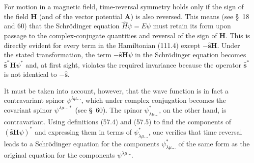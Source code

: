 For motion in a magnetic field, time-reversal symmetry holds only if the sign of the field $\mathbf H$ (and of the vector potential $\mathbf A$) is also reversed. This means (see \S~18 and 60) that the Schrödinger equation $\hat H\psi=E\psi$ must retain its form upon passage to the complex-conjugate quantities and reversal of the sign of $\mathbf H$. This is directly evident for every term in the Hamiltonian (111.4) except $-\hat{\mathbf s}\mathbf H$. Under the stated transformation, the term $-\hat{\mathbf s}\mathbf H\psi$ in the Schrödinger equation becomes $\hat{\mathbf s}^{*}\mathbf H\psi^{*}$ and, at first sight, violates the required invariance because the operator $\hat{\mathbf s}^{*}$ is not identical to $-\hat{\mathbf s}$.

It must be taken into account, however, that the wave function is in fact a contravariant spinor $\psi^{\lambda\mu\ldots}$, which under complex conjugation becomes the covariant spinor $\psi^{\lambda\mu\ldots *}$ (see \S~60). The spinor $\psi^{*}_{\lambda\mu\ldots}$, on the other hand, is contravariant. Using definitions (57.4) and (57.5) to find the components of $(\hat{\mathbf s}\mathbf H\psi)^*$ and expressing them in terms of $\psi^{*}_{\lambda\mu\ldots}$, one verifies that time reversal leads to a Schrödinger equation for the components $\psi^{*}_{\lambda\mu\ldots}$ of the same form as the original equation for the components $\psi^{\lambda\mu\ldots}$.
